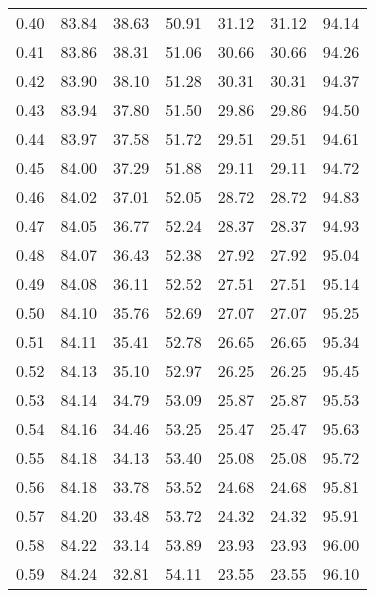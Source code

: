 \begin{tabular}{|c|c|c|c|c|c|c|}
      0.40 &     83.84 &     38.63 &      50.91 &   31.12 &      31.12 &         94.14 \\
      0.41 &     83.86 &     38.31 &      51.06 &   30.66 &      30.66 &         94.26 \\
      0.42 &     83.90 &     38.10 &      51.28 &   30.31 &      30.31 &         94.37 \\
      0.43 &     83.94 &     37.80 &      51.50 &   29.86 &      29.86 &         94.50 \\
      0.44 &     83.97 &     37.58 &      51.72 &   29.51 &      29.51 &         94.61 \\
      0.45 &     84.00 &     37.29 &      51.88 &   29.11 &      29.11 &         94.72 \\
      0.46 &     84.02 &     37.01 &      52.05 &   28.72 &      28.72 &         94.83 \\
      0.47 &     84.05 &     36.77 &      52.24 &   28.37 &      28.37 &         94.93 \\
      0.48 &     84.07 &     36.43 &      52.38 &   27.92 &      27.92 &         95.04 \\
      0.49 &     84.08 &     36.11 &      52.52 &   27.51 &      27.51 &         95.14 \\
      0.50 &     84.10 &     35.76 &      52.69 &   27.07 &      27.07 &         95.25 \\
      0.51 &     84.11 &     35.41 &      52.78 &   26.65 &      26.65 &         95.34 \\
      0.52 &     84.13 &     35.10 &      52.97 &   26.25 &      26.25 &         95.45 \\
      0.53 &     84.14 &     34.79 &      53.09 &   25.87 &      25.87 &         95.53 \\
      0.54 &     84.16 &     34.46 &      53.25 &   25.47 &      25.47 &         95.63 \\
      0.55 &     84.18 &     34.13 &      53.40 &   25.08 &      25.08 &         95.72 \\
      0.56 &     84.18 &     33.78 &      53.52 &   24.68 &      24.68 &         95.81 \\
      0.57 &     84.20 &     33.48 &      53.72 &   24.32 &      24.32 &         95.91 \\
      0.58 &     84.22 &     33.14 &      53.89 &   23.93 &      23.93 &         96.00 \\
      0.59 &     84.24 &     32.81 &      54.11 &   23.55 &      23.55 &         96.10 \\

\end{tabular}
